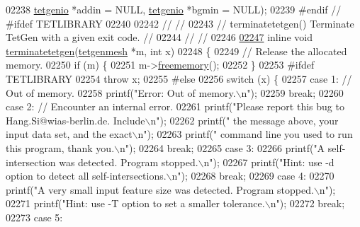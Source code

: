 \begin{DoxyCode}
02238                     \hyperlink{classtetgenio}{tetgenio} *addin = NULL, \hyperlink{classtetgenio}{tetgenio} *bgmin = NULL);
02239 \textcolor{preprocessor}{#endif // #ifdef TETLIBRARY}
02240 
02242 \textcolor{comment}{//                                                                           //}
02243 \textcolor{comment}{// terminatetetgen()    Terminate TetGen with a given exit code.             //}
02244 \textcolor{comment}{//                                                                           //}
02246 \textcolor{comment}{}
\hypertarget{tetgen_8h_source.tex_l02247}{}\hyperlink{tetgen_8h_a4012bf160c63ec4ff007f6645b993ca5}{02247} \textcolor{keyword}{inline} \textcolor{keywordtype}{void} \hyperlink{tetgen_8h_a4012bf160c63ec4ff007f6645b993ca5}{terminatetetgen}(\hyperlink{classtetgenmesh}{tetgenmesh} *m, \textcolor{keywordtype}{int} x)
02248 \{
02249   \textcolor{comment}{// Release the allocated memory.}
02250   \textcolor{keywordflow}{if} (m) \{
02251     m->\hyperlink{classtetgenmesh_ade805f03ec7ca1b4623c8148fb915278}{freememory}();
02252   \}
02253 \textcolor{preprocessor}{#ifdef TETLIBRARY}
02254   \textcolor{keywordflow}{throw} x;
02255 \textcolor{preprocessor}{#else}
02256   \textcolor{keywordflow}{switch} (x) \{
02257   \textcolor{keywordflow}{case} 1: \textcolor{comment}{// Out of memory.}
02258     printf(\textcolor{stringliteral}{"Error:  Out of memory.\(\backslash\)n"}); 
02259     \textcolor{keywordflow}{break};
02260   \textcolor{keywordflow}{case} 2: \textcolor{comment}{// Encounter an internal error.}
02261     printf(\textcolor{stringliteral}{"Please report this bug to Hang.Si@wias-berlin.de. Include\(\backslash\)n"});
02262     printf(\textcolor{stringliteral}{"  the message above, your input data set, and the exact\(\backslash\)n"});
02263     printf(\textcolor{stringliteral}{"  command line you used to run this program, thank you.\(\backslash\)n"});
02264     \textcolor{keywordflow}{break};
02265   \textcolor{keywordflow}{case} 3:
02266     printf(\textcolor{stringliteral}{"A self-intersection was detected. Program stopped.\(\backslash\)n"});
02267     printf(\textcolor{stringliteral}{"Hint: use -d option to detect all self-intersections.\(\backslash\)n"}); 
02268     \textcolor{keywordflow}{break};
02269   \textcolor{keywordflow}{case} 4:
02270     printf(\textcolor{stringliteral}{"A very small input feature size was detected. Program stopped.\(\backslash\)n"});
02271     printf(\textcolor{stringliteral}{"Hint: use -T option to set a smaller tolerance.\(\backslash\)n"});
02272     \textcolor{keywordflow}{break};
02273   \textcolor{keywordflow}{case} 5:

\end{DoxyCode}
